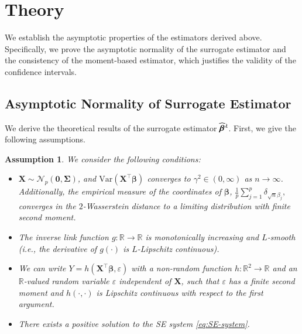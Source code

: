 \documentclass[12pt,reqno]{amsart}
\newtheorem{assumption}{Assumption}
\newcommand{\R}{\mathbb{R}}
\newcommand{\cc}{\color{black}}
\newcommand{\ccc}{\color{black}}
\renewcommand{\hat}{\widehat}
\def\bzero{\bm{0}}
\def\bX{\bm{X}}
\def\bbeta{\bm{\beta}}
\def\bSigma{\bm{\Sigma}}
\begin{document}
\section{Theory}
\label{sec:theory}
We establish the asymptotic properties of the estimators derived above. Specifically, we prove the asymptotic normality of the surrogate estimator and the consistency of the moment-based estimator, which justifies the validity of the confidence intervals.

\subsection{Asymptotic Normality of Surrogate Estimator}

We derive the theoretical results of the surrogate estimator $\hat{\bbeta}^{\ccc\lambda}$. 
First, we give the following assumptions.
\begin{assumption}
We consider the following conditions: \label{asmp:basic} 
\setlength{\leftmargini}{27pt} 
    \begin{itemize}
      \setlength{\parskip}{0cm}
  \setlength{\itemsep}{0cm}
    \item[(A1)] $\bX \sim\mathcal{N}_p(\bzero,\bSigma)$, and $\mathrm{Var}(\bX^\top\bbeta)$ converges to $\gamma^2\in(0,\infty)$ as $n\to\infty$.
    {\cc
    Additionally, the empirical measure of the coordinates of $\bm{\beta}$, $\frac{1}{p}\sum_{j=1}^p \delta_{\sqrt{n}\beta_j},$
converges in the $2$-Wasserstein distance to a limiting distribution with finite second moment.}
    \item[(A2)] {\cc The} inverse link function $g:\R\to\R$ is monotonically increasing and $L$-smooth (i.e., the derivative of $g(\cdot)$ is $L$-Lipschitz continuous). 
    \item[(A3)] We can write $Y=h(\bX^\top\bbeta,\varepsilon)$ with a non-random function $h: \R^2 \to \R$ and an $\R$-valued random variable $\varepsilon$ independent of $\bX$, such that $\varepsilon$ has a finite second moment and $h(\cdot,\cdot)$ is Lipschitz continuous with respect to the first argument.
    \item[(A4)] There exists a positive solution to the SE system \eqref{eq:SE-system}.
\end{itemize}
\end{assumption}
\end{document}
